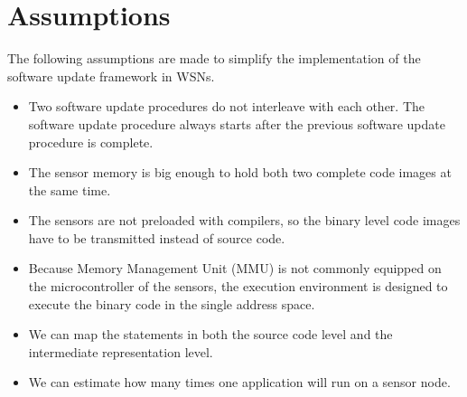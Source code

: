 \section{Assumptions}
The following assumptions are made to simplify the implementation of the software update framework in WSNs.
\begin{itemize}
\item Two software update procedures do not interleave with each other. The software update procedure always starts after the previous software update procedure is complete.
\item The sensor memory is big enough to hold both two complete code images at the same time.
\item The sensors are not preloaded with compilers, so the binary level code images have to be transmitted instead of source code.
\item Because Memory Management Unit (MMU) is not commonly equipped on the microcontroller of the sensors, the execution environment is designed to execute the binary code in the single address space. 
\item We can map the statements in both the source code level and the intermediate representation level.
\item We can estimate how many times one application will run on a sensor node.

\end{itemize}
